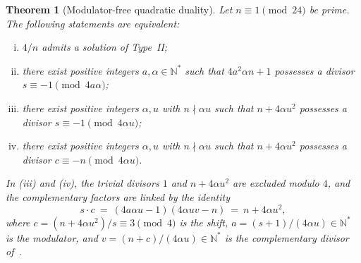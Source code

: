 \documentclass[11pt, a4paper]{article}
\theoremstyle{plain}
\newtheorem{theorem}{Theorem}[section]
\theoremstyle{definition}
\newcommand{\N}{\mathbb{N}}
\begin{document}
\begin{theorem}[Modulator-free quadratic duality]\label{thm:quadratic_duality}
Let $n\equiv1\pmod{24}$ be prime. The following statements are equivalent:
\begin{enumerate}[(i)]
    \item $4/n$ admits a solution of Type~II;
    \item there exist positive integers $a,\alpha\in\N^{\ast}$ such that $4a^{2}\alpha n+1$ possesses a divisor $s\equiv-1\pmod{4a\alpha}$;
    \item there exist positive integers $\alpha,u$ with $n\nmid\alpha u$ such that $n+4\alpha u^{2}$ possesses a divisor $s\equiv-1\pmod{4\alpha u}$;
    \item there exist positive integers $\alpha,u$ with $n\nmid\alpha u$ such that $n+4\alpha u^{2}$ possesses a divisor $c\equiv-n\pmod{4\alpha u}$.
\end{enumerate}
In (iii) and (iv), the trivial divisors $1$ and $n+4\alpha u^{2}$ are excluded modulo $4$, and the complementary factors are linked by the identity
\begin{equation}\label{eq:sc_factorization}
s\cdot c\ =\ (4a\alpha u-1)(4\alpha uv-n)\ =\ n+4\alpha u^{2},
\end{equation}
where $c=(n+4\alpha u^{2})/s\equiv3\pmod 4$ is the shift, $a=(s+1)/(4\alpha u)\in\N^{\ast}$ is the modulator, and $v=(n+c)/(4\alpha u)\in\N^{\ast}$ is the complementary divisor of~\cite[Thm.~3.9]{dahan2026a}.
\end{theorem}
\end{document}
